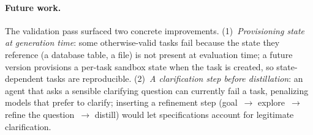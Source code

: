 \paragraph{Future work.} The validation pass surfaced two concrete
improvements. (1)~\emph{Provisioning state at generation time}: some
otherwise-valid tasks fail because the state they reference (a database
table, a file) is not present at evaluation time; a future version provisions
a per-task sandbox state when the task is created, so state-dependent tasks
are reproducible. (2)~\emph{A clarification step before distillation}: an
agent that asks a sensible clarifying question can currently fail a task,
penalizing models that prefer to clarify; inserting a refinement step
(goal~$\rightarrow$ explore~$\rightarrow$ refine the question~$\rightarrow$
distill) would let specifications account for legitimate clarification.
